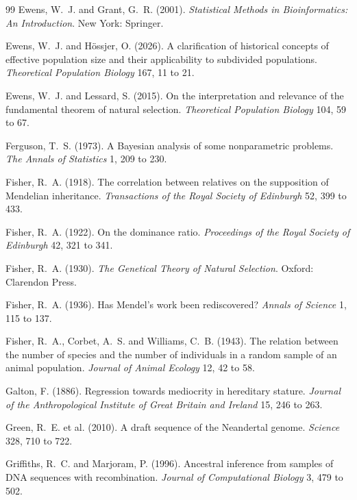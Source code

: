 \begin{thebibliography}{99}
Ewens, W.~J. and Grant, G.~R. (2001). \emph{Statistical Methods in Bioinformatics: An
Introduction}. New York: Springer.

Ewens, W.~J. and H\"ossjer, O. (2026). A clarification of historical concepts of effective
population size and their applicability to subdivided populations. \emph{Theoretical Population
Biology} 167, 11 to 21.

Ewens, W.~J. and Lessard, S. (2015). On the interpretation and relevance of the fundamental
theorem of natural selection. \emph{Theoretical Population Biology} 104, 59 to 67.

Ferguson, T.~S. (1973). A Bayesian analysis of some nonparametric problems. \emph{The Annals of
Statistics} 1, 209 to 230.

Fisher, R.~A. (1918). The correlation between relatives on the supposition of Mendelian
inheritance. \emph{Transactions of the Royal Society of Edinburgh} 52, 399 to 433.

Fisher, R.~A. (1922). On the dominance ratio. \emph{Proceedings of the Royal Society of
Edinburgh} 42, 321 to 341.

Fisher, R.~A. (1930). \emph{The Genetical Theory of Natural Selection}. Oxford: Clarendon Press.

Fisher, R.~A. (1936). Has Mendel's work been rediscovered? \emph{Annals of Science} 1, 115 to
137.

Fisher, R.~A., Corbet, A.~S. and Williams, C.~B. (1943). The relation between the number of
species and the number of individuals in a random sample of an animal population. \emph{Journal
of Animal Ecology} 12, 42 to 58.

Galton, F. (1886). Regression towards mediocrity in hereditary stature. \emph{Journal of the
Anthropological Institute of Great Britain and Ireland} 15, 246 to 263.

Green, R.~E. et al. (2010). A draft sequence of the Neandertal genome. \emph{Science} 328, 710 to
722.

Griffiths, R.~C. and Marjoram, P. (1996). Ancestral inference from samples of DNA sequences with
recombination. \emph{Journal of Computational Biology} 3, 479 to 502.


\end{thebibliography}
